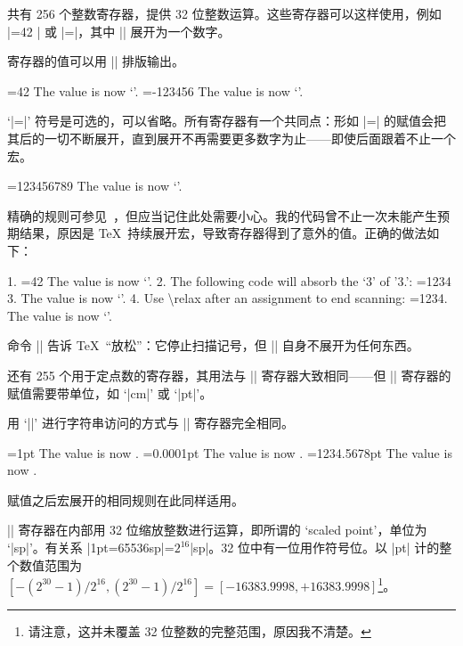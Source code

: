 \documentclass[a4paper,doc2]{ltxdoc}
\begin{document}
\begin{command}{\count{}}
	共有 256 个整数寄存器，提供 32 位整数运算。这些寄存器可以这样使用，例如 |=42 | 或 |=\macro |，其中 |\macro| 展开为一个数字。

	寄存器的值可以用 |\the| 排版输出。
\begin{codeexample}[]
=42
The value is now `\the{}'.
\def\macro{-123456}
=\macro
The value is now `\the{}'.
\end{codeexample}

	`|=|' 符号是可选的，可以省略。所有寄存器有一个共同点：形如 |=|\meta{$\cdots$} 的赋值会把其后的一切不断展开，直到展开不再需要更多数字为止——即使后面跟着不止一个宏。
\begin{codeexample}[]
\def\firstmacro{123}
\def\secondmacro{456}
\def\thirdmacro{789}
=\firstmacro\secondmacro\thirdmacro
The value is now `\the{}'.
\end{codeexample}
 精确的规则可参见~\cite{texbook}，但应当记住此处需要小心。我的代码曾不止一次未能产生预期结果，原因是 \TeX\ 持续展开宏，导致寄存器得到了意外的值。正确的做法如下：
\begin{codeexample}[]
1. =42 %
The value is now `\the{}'.
2. The following code will absorb the `3' of '3.':
\def\macro{1234}
=\macro %
3. The value is now `\the{}'.
4. Use \textbackslash relax after an assignment to end scanning:
=\macro{}. The value is now `\the{}'.
\end{codeexample}
	命令 |\relax| 告诉 \TeX\ ``放松''：它停止扫描记号，但 |\relax| 自身不展开为任何东西。
\end{command}

\begin{command}{\dimen{}}
	还有 255 个用于定点数的寄存器，其用法与 |\count| 寄存器大致相同——但 |\dimen| 寄存器的赋值需要带单位，如 `|cm|' 或 `|pt|'。

	用 `|\the|' 进行字符串访问的方式与 |\count| 寄存器完全相同。
\begin{codeexample}[]
=1pt
The value is now \the{}.
=0.0001pt
The value is now \the{}.
\def\macro{1234.5678}
=\macro pt
The value is now \the{}.
\end{codeexample}
	赋值之后宏展开的相同规则在此同样适用。

	|\dimen| 寄存器在内部用 32 位缩放整数进行运算，即所谓的 `scaled point'，单位为 `|sp|'。有关系 |1pt=65536sp|=$2^{16}$|sp|。32 位中有一位用作符号位。以 |pt| 计的整个数值范围为 $[-(2^{30}-1)/2^{16}, (2^{30}-1)/2^{16} ] = [-16383.9998,+16383.9998]$\footnote{请注意，这并未覆盖 32 位整数的完整范围，原因我不清楚。}。
\end{command}
\end{document}
